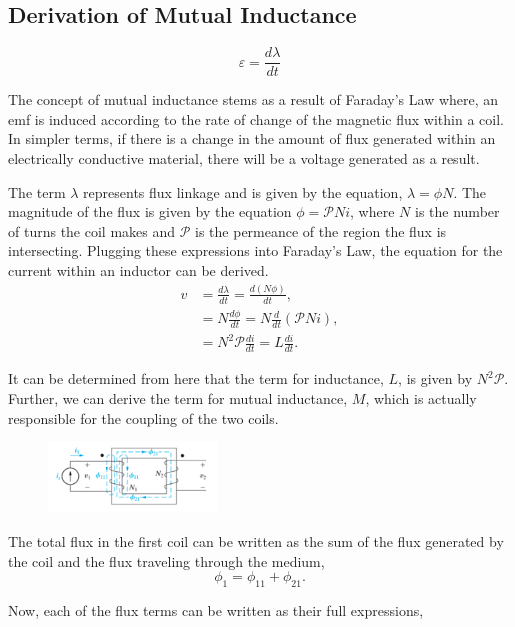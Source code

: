\documentclass[12pt]{article}
\begin{document}
    \subsection*{Derivation of Mutual Inductance}
    \[
        \varepsilon = \frac{d\lambda}{dt}
    \]
    \par The concept of mutual inductance stems as a result of Faraday's Law
    where, an emf is induced according to the rate of change of the magnetic
    flux within a coil. In simpler terms, if there is a change in the amount of
    flux generated within an electrically conductive material, there will be a
    voltage generated as a result.
    \par The term $\lambda$ represents flux linkage and is given by the
    equation, $\lambda = \phi N$. The magnitude of the flux is given by the
    equation $\phi = \mathcal{P} N i$, where $N$ is the number of turns the coil
    makes and $\mathcal{P}$ is the permeance of the region the flux is
    intersecting. Plugging these expressions into Faraday's Law, the equation
    for the current within an inductor can be derived.
    \begin{align*}
        v & = \frac{d\lambda}{dt} = \frac{d(N\phi)}{dt}, \\
          & = N \frac{d\phi}{dt} = N \frac{d}{dt}(\mathcal{P}Ni), \\
          & = N^2 \mathcal{P} \frac{di}{dt} = L \frac{di}{dt}.
    \end{align*}
    \par It can be determined from here that the term for inductance, $L$, is
    given by $N^2\mathcal{P}$. Further, we can derive the term for mutual
    inductance, $M$, which is actually responsible for the coupling of the two
    coils.
    \begin{figure}[h]
        \centering
        \includegraphics[width=0.4\textwidth]{Coupled Coils.png}
    \end{figure}
    \par The total flux in the first coil can be written as the sum of the flux
    generated by the coil and the flux traveling through the medium,
    \[
        \phi_1 = \phi_{11} + \phi_{21}
    .\]
    \par Now, each of the flux terms can be written as their full expressions,
\end{document}
